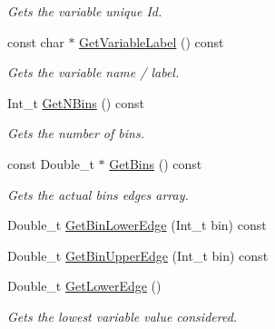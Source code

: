 \begin{DoxyCompactItemize}
\begin{DoxyCompactList}\small\item\em Gets the variable unique Id. \end{DoxyCompactList}\item 
\mbox{\label{classQn_1_1EventClassVariable_a1375e59e436e9f548d73e4f0b088e383}} 
const char $\ast$ \mbox{\hyperlink{classQn_1_1EventClassVariable_a1375e59e436e9f548d73e4f0b088e383}{Get\+Variable\+Label}} () const
\begin{DoxyCompactList}\small\item\em Gets the variable name / label. \end{DoxyCompactList}\item 
\mbox{\label{classQn_1_1EventClassVariable_a1062547d193d6cbee57c372aded6e735}} 
Int\+\_\+t \mbox{\hyperlink{classQn_1_1EventClassVariable_a1062547d193d6cbee57c372aded6e735}{Get\+N\+Bins}} () const
\begin{DoxyCompactList}\small\item\em Gets the number of bins. \end{DoxyCompactList}\item 
\mbox{\label{classQn_1_1EventClassVariable_a0ccf71156817657ed2a63e6b6c16c2e2}} 
const Double\+\_\+t $\ast$ \mbox{\hyperlink{classQn_1_1EventClassVariable_a0ccf71156817657ed2a63e6b6c16c2e2}{Get\+Bins}} () const
\begin{DoxyCompactList}\small\item\em Gets the actual bins edges array. \end{DoxyCompactList}\item 
Double\+\_\+t \mbox{\hyperlink{classQn_1_1EventClassVariable_a117fcb0c7496e08d6aa61f24a52cc652}{Get\+Bin\+Lower\+Edge}} (Int\+\_\+t bin) const
\item 
Double\+\_\+t \mbox{\hyperlink{classQn_1_1EventClassVariable_a457a9a46cdfd22f3496da1e113baba3d}{Get\+Bin\+Upper\+Edge}} (Int\+\_\+t bin) const
\item 
\mbox{\label{classQn_1_1EventClassVariable_a32e9a9a359d84000ad39623b0914cc2e}} 
Double\+\_\+t \mbox{\hyperlink{classQn_1_1EventClassVariable_a32e9a9a359d84000ad39623b0914cc2e}{Get\+Lower\+Edge}} ()
\begin{DoxyCompactList}\small\item\em Gets the lowest variable value considered. \end{DoxyCompactList}\item 

\end{DoxyCompactItemize}
